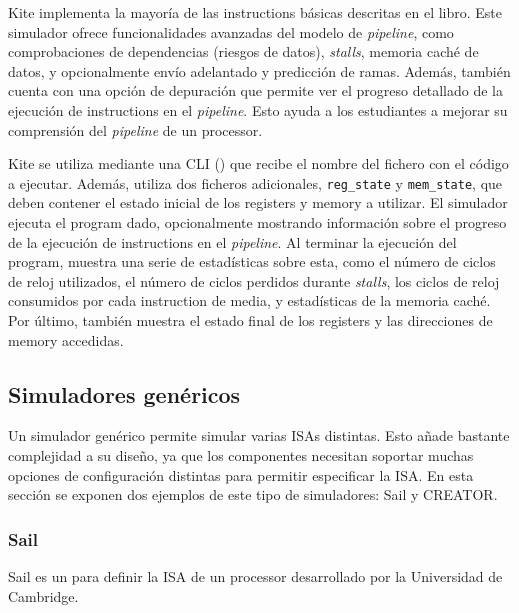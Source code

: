 Kite implementa la mayoría de las \glspl{instruction} básicas descritas en el
libro. Este simulador ofrece funcionalidades avanzadas del modelo de
\textit{pipeline}, como comprobaciones de dependencias (riesgos de datos),
\textit{stalls}, memoria caché de datos, y opcionalmente envío adelantado y
predicción de ramas. Además, también cuenta con una opción de depuración que
permite ver el progreso detallado de la ejecución de \glspl{instruction} en el
\textit{pipeline}. Esto ayuda a los estudiantes a mejorar su comprensión del
\textit{pipeline} de un \gls{processor}.

Kite se utiliza mediante una \gls{CLI} () que recibe el nombre
del fichero con el código  a ejecutar. Además,
utiliza dos ficheros adicionales, \verb!reg_state! y \verb!mem_state!, que deben
contener el estado inicial de los \glspl{register} y \gls{memory} a utilizar. El
simulador ejecuta el \gls{program} dado, opcionalmente mostrando información
sobre el progreso de la ejecución de \glspl{instruction} en el
\textit{pipeline}. Al terminar la ejecución del \gls{program}, muestra una serie
de estadísticas sobre esta, como el número de ciclos de reloj utilizados, el
número de ciclos perdidos durante \textit{stalls}, los ciclos de reloj
consumidos por cada \gls{instruction} de media, y estadísticas de la memoria
caché. Por último, también muestra el estado final de los \glspl{register} y las
direcciones de \gls{memory} accedidas.


\FloatBarrier

\subsection{Simuladores genéricos}

Un simulador genérico permite simular varias \glspl{ISA} distintas. Esto añade
bastante complejidad a su diseño, ya que los componentes necesitan soportar
muchas opciones de configuración distintas para permitir especificar la
\gls{ISA}. En esta sección se exponen dos ejemplos de este tipo de simuladores:
Sail y CREATOR.

\subsubsection{Sail}

Sail \parencite{sail} es un  para
definir la \gls{ISA} de un \gls{processor} desarrollado por la Universidad de
Cambridge.

